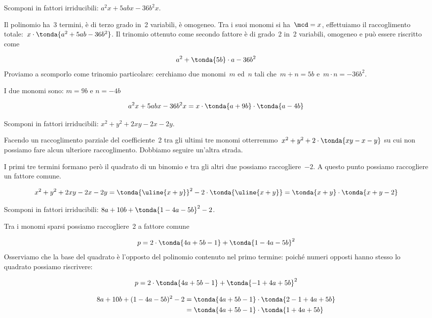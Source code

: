 \begin{esempio}{}{}
Scomponi in fattori irriducibili: \(a^{2}x+5abx-36b^{2}x\).

Il polinomio ha~3 termini, è di terzo grado in~2 variabili, è omogeneo.
Tra i suoi monomi si ha~\(\mcd= x\), effettuiamo il raccoglimento
totale:~\(x\cdot\tonda{a^{2}+5ab-36b^{2}}\).
Il trinomio ottenuto come secondo fattore è di grado~2 in~2 variabili,
omogeneo e può essere riscritto come 

\vspace{-1em}
\[a^{2} +\tonda{5b}\cdot a -36b^{2}\]
Proviamo a scomporlo come trinomio particolare:
cerchiamo due monomi~\(m\) ed~\(n\) tali che~\(m+n=5b\)
e~\(m\cdot n=-36b^{2}\). 

I due monomi sono: \quad \(m = 9b\) \quad e \quad \(n = -4b\)

\vspace{-1em}
\[a^{2}x +5abx-36b^{2}x = x\cdot\tonda{a +9b}\cdot \tonda{a -4b}\]
\end{esempio}

\begin{esempio}{}{}
Scomponi in fattori irriducibili: \(x^2+y^{2}+2xy-2x-2y\).

Facendo un raccoglimento parziale del coefficiente~2 tra gli ultimi tre 
monomi otterremmo~\(x^2+y^{2}+2\cdot\tonda{xy-x-y}\) su cui non possiamo
fare alcun ulteriore raccoglimento.
Dobbiamo seguire un'altra strada.

I primi tre termini formano però il quadrato di un binomio e tra gli
altri due possiamo raccogliere~\(-2\). 
A questo punto possiamo raccogliere un fattore comune.

\vspace{-1em}
\begin{equation*}
x^2 +y^{2} +2xy -2x -2y =
\tonda{\uline{{x+y}}}^{2}-2\cdot\tonda{\uline{{x+y}}} =
\tonda{x+y}\cdot \tonda{x+y-2}
\end{equation*}
\end{esempio}

\begin{esempio}{}{}
Scomponi in fattori irriducibili: \(8a+10b+\tonda{1-4a-5b}^{2}-2\).

Tra i monomi sparsi possiamo raccogliere~2 a fattore comune

\vspace{-1em}
\[p=2\cdot \tonda{4a+5b-1}+\tonda{1-4a-5b}^{2}\]
Osserviamo che la base del quadrato è l'opposto del polinomio contenuto
nel primo termine: poiché numeri opposti hanno
stesso lo quadrato possiamo riscrivere:

\vspace{-1em}
\[p=2\cdot\tonda{4a+5b-1}+\tonda{-1+4a+5b}^{2}\]

\vspace{-2em}
\begin{align*}
8a+10b+(1-4a-5b)^{2}-2&=\tonda{4a+5b-1}\cdot\tonda{2-1+4a+5b}\\
&=\tonda{4a+5b-1}\cdot\tonda{1+4a+5b}
\end{align*}
\end{esempio}

